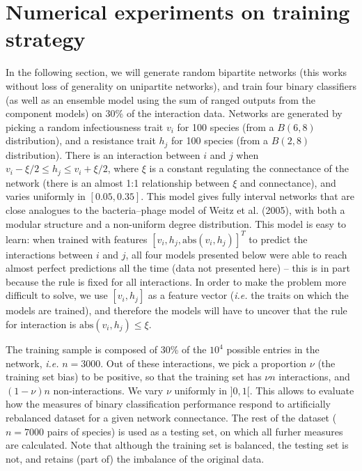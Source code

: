 \documentclass[10pt,oneside]{article}
\begin{document}
\hypertarget{numerical-experiments-on-training-strategy}{%
\section{Numerical experiments on training
strategy}\label{numerical-experiments-on-training-strategy}}

In the following section, we will generate random bipartite networks
(this works without loss of generality on unipartite networks), and
train four binary classifiers (as well as an ensemble model using the
sum of ranged outputs from the component models) on 30\% of the
interaction data. Networks are generated by picking a random
infectiousness trait \(v_i\) for 100 species (from a \(B(6,8)\)
distribution), and a resistance trait \(h_j\) for 100 species (from a
\(B(2,8)\) distribution). There is an interaction between \(i\) and
\(j\) when \(v_i-\xi/2 \le h_j \le v_i+\xi/2\), where \(\xi\) is a
constant regulating the connectance of the network (there is an almost
1:1 relationship between \(\xi\) and connectance), and varies uniformly
in \([0.05, 0.35]\). This model gives fully interval networks that are
close analogues to the bacteria--phage model of Weitz et al. (2005),
with both a modular structure and a non-uniform degree distribution.
This model is easy to learn: when trained with features
\([v_i, h_j, \text{abs}(v_i, h_j)] ^T\) to predict the interactions
between \(i\) and \(j\), all four models presented below were able to
reach almost perfect predictions all the time (data not presented here)
-- this is in part because the rule is fixed for all interactions. In
order to make the problem more difficult to solve, we use \([v_i, h_j]\)
as a feature vector (\emph{i.e.} the traits on which the models are
trained), and therefore the models will have to uncover that the rule
for interaction is \(\text{abs}(v_i, h_j) \le \xi\).

The training sample is composed of 30\% of the \(10^4\) possible entries
in the network, \emph{i.e.} \(n=3000\). Out of these interactions, we
pick a proportion \(\nu\) (the training set bias) to be positive, so
that the training set has \(\nu n\) interactions, and \((1-\nu) n\)
non-interactions. We vary \(\nu\) uniformly in \(]0,1[\). This allows to
evaluate how the measures of binary classification performance respond
to artificially rebalanced dataset for a given network connectance. The
rest of the dataset (\(n=7000\) pairs of species) is used as a testing
set, on which all furher measures are calculated. Note that although the
training set is balanced, the testing set is not, and retains (part of)
the imbalance of the original data.
\end{document}
